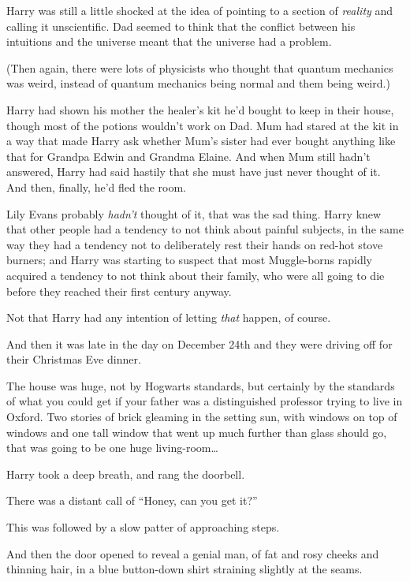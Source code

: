 Harry was still a little shocked at the idea of pointing to a section of \emph{reality} and calling it unscientific. Dad seemed to think that the conflict between his intuitions and the universe meant that the universe had a problem.

(Then again, there were lots of physicists who thought that quantum mechanics was weird, instead of quantum mechanics being normal and them being weird.)

Harry had shown his mother the healer’s kit he’d bought to keep in their house, though most of the potions wouldn’t work on Dad. Mum had stared at the kit in a way that made Harry ask whether Mum’s sister had ever bought anything like that for Grandpa Edwin and Grandma Elaine. And when Mum still hadn’t answered, Harry had said hastily that she must have just never thought of it. And then, finally, he’d fled the room.

Lily Evans probably \emph{hadn’t} thought of it, that was the sad thing. Harry knew that other people had a tendency to not think about painful subjects, in the same way they had a tendency not to deliberately rest their hands on red-hot stove burners; and Harry was starting to suspect that most Muggle-borns rapidly acquired a tendency to not think about their family, who were all going to die before they reached their first century anyway.

Not that Harry had any intention of letting \emph{that} happen, of course.

And then it was late in the day on December 24th and they were driving off for their Christmas Eve dinner.

\later

The house was huge, not by Hogwarts standards, but certainly by the standards of what you could get if your father was a distinguished professor trying to live in Oxford. Two stories of brick gleaming in the setting sun, with windows on top of windows and one tall window that went up much further than glass should go, that was going to be one huge living-room…

Harry took a deep breath, and rang the doorbell.

There was a distant call of
“Honey, can you get it?”

This was followed by a slow patter of approaching steps.

And then the door opened to reveal a genial man, of fat and rosy cheeks and thinning hair, in a blue button-down shirt straining slightly at the seams.

